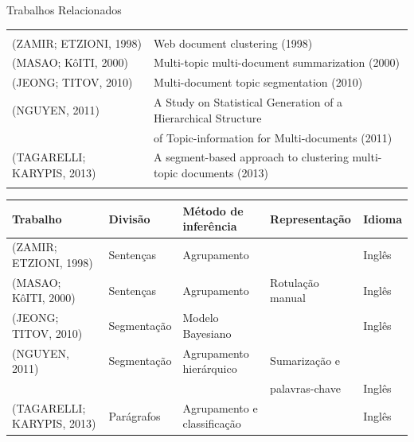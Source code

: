 \documentclass[xcolor=table]{beamer}
\begin{document}
\begin{frame}{Trabalhos Relacionados}

\tiny
\begin{table}[!h]
	\centering

	\begin{tabular}{ll} \hline\\
		(ZAMIR; ETZIONI, 1998) &      Web document clustering (1998)   \\ 
		(MASAO; KôITI, 2000) &        Multi-topic multi-document summarization  (2000)  \\ 
		(JEONG; TITOV, 2010) &        Multi-document topic segmentation (2010)  \\ 
		(NGUYEN, 2011) &              A Study on Statistical Generation of a Hierarchical Structure \\ & of Topic-information for Multi-documents (2011)  \\
		(TAGARELLI; KARYPIS, 2013) &  A segment-based approach to clustering multi-topic documents (2013) \\ \\ \hline
	\end{tabular}
\end{table}




\tiny
\begin{table}[!h]
	\centering

	\begin{tabular}{lllll} \hline
		\textbf{Trabalho} & \textbf{Divisão} & \textbf{Método de inferência}  & \textbf{Representação} & \textbf{Idioma}\\
		\hline\hline

	
	 (ZAMIR; ETZIONI, 1998) &      	Sentenças  & Agrupamento                 & & Inglês \\ \hline
	 (MASAO; KôITI, 2000) &        	Sentenças  & Agrupamento                 & Rotulação manual & Inglês \\ \hline
	 (JEONG; TITOV, 2010) &        	Segmentação   & Modelo Bayesiano            & & Inglês \\ \hline
	 (NGUYEN, 2011) &              	Segmentação  & Agrupamento hierárquico     & Sumarização e \\ &&&palavras-chave& Inglês  \\ \hline
	 (TAGARELLI; KARYPIS, 2013) &  	Parágrafos & Agrupamento e classificação & & Inglês \\ \hline

	\end{tabular}

\end{table}





\end{frame}
\end{document}
